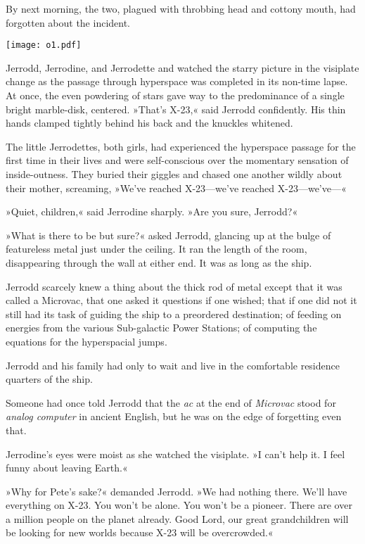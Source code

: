 \documentclass[11pt,twocolumn,paper=a5,pagesize]{article}
\newcommand{\q}[1]{»#1«}
\newcommand{\futureone}[1]{ #1 }
\newcommand{\sepa}[0]{\vspace{.6cm} {\centering 

\texttt{[image: o1.pdf]}

}\vspace{.6cm}}
\newcommand{\initial}[1]{ \lettrine[lines=3,lhang=0.3,nindent=0em]{  {\textsf{#1}}}{}}
\newcommand{\initialb}[1]{ \lettrine[lines=3,lhang=0.3,nindent=1em]{  {\textsf{#1}}}{}}
\begin{document}
By next morning, the two, plagued with throbbing head and cottony mouth, 
had forgotten about the incident.

\sepa{}

\futureone{
\initial{J}errodd, Jerrodine, and Jerrodette \MakeUppercase{\romannumeral 1}
and \MakeUppercase{\romannumeral 2} watched the starry picture in the 
visiplate change as the passage through hyperspace was completed in its 
non-time lapse. At once, the even powdering of stars gave way to the 
predominance of a single bright marble-disk, centered.
\q{That's X-23,} said Jerrodd confidently. His thin hands clamped tightly 
behind his back and the knuckles whitened.

The little Jerrodettes, both girls, had experienced the hyperspace passage 
for the first time in their lives and were self-conscious over the momentary 
sensation of inside-outness. They buried their giggles and chased one another 
wildly about their mother, screaming, \q{We've reached X-23---we've reached 
X-23---we've---}

\q{Quiet, children,} said Jerrodine sharply. \q{Are you sure, Jerrodd?}

\q{What is there to be but sure?} asked Jerrodd, glancing up at the bulge 
of featureless metal just under the ceiling. It ran the length of the room, 
disappearing through the wall at either end. It was as long as the ship.

Jerrodd scarcely knew a thing about the thick rod of metal except that it 
was called a Microvac, that one asked it questions if one wished; that if 
one did not it still had its task of guiding the ship to a preordered 
destination; of feeding on energies from the various Sub-galactic Power 
Stations; of computing the equations for the hyperspacial jumps.

Jerrodd and his family had only to wait and live in the comfortable residence 
quarters of the ship.

Someone had once told Jerrodd that the \textit{ac} at the end of 
\textit{Microvac} stood for \textit{analog computer} in ancient English, but 
he was on the edge of forgetting even that.

Jerrodine's eyes were moist as she watched the visiplate. \q{I can't help it. 
I feel funny about leaving Earth.}

\q{Why for Pete's sake?} demanded Jerrodd. \q{We had nothing there. We'll 
have everything on X-23. You won't be alone. You won't be a pioneer. There 
are over a million people on the planet already. Good Lord, our great 
grandchildren will be looking for new worlds because X-23 will be overcrowded.}

}
\end{document}
